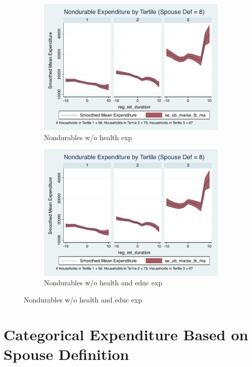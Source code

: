 \documentclass[11pt,onecolumn]{article}
\numberwithin{figure}{section}
\begin{document}
\begin{figure}
  \begin{subfigure}{0.5\textwidth}
  \centering
 	\includegraphics[width=0.9\linewidth]{../ConsumptionPostRetirement_by_SpouseDef/Smoothed_xhealth/spouse_def_8.pdf}
    \caption{Nondurables w/o health exp}
    \label{fig:chapter001_dist_001}
  \end{subfigure}
  	\hspace{1cm}
  \begin{subfigure}{0.5\textwidth}
 	\includegraphics[width=0.9\linewidth]{../ConsumptionPostRetirement_by_SpouseDef/Smoothed_xhealth_educ/spouse_def_8.pdf}
    \caption{Nondurables w/o health and educ exp}
    \label{fig:chapter001_reward_001}
  \end{subfigure}
\end{figure}
\clearpage




\section{Categorical Expenditure Based on Spouse Definition}
\end{document}
